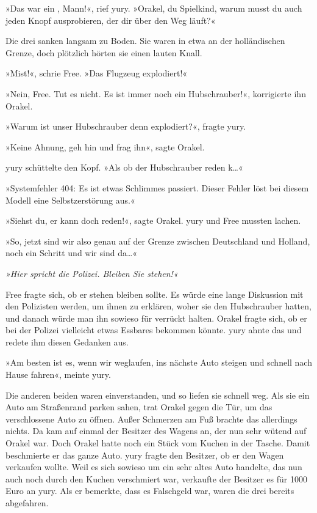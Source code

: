 »Das war ein , Mann!«, rief yury. »Orakel, du Spielkind, warum musst du auch jeden Knopf ausprobieren, der dir über den Weg läuft?«

Die drei sanken langsam zu Boden. Sie waren in etwa an der holländischen Grenze, doch plötzlich hörten sie einen lauten Knall.

»Mist!«, schrie Free. »Das Flugzeug explodiert!«

»Nein, Free. Tut es nicht. Es ist immer noch ein Hubschrauber!«, korrigierte ihn Orakel.

»Warum ist unser Hubschrauber denn explodiert?«, fragte yury.

»Keine Ahnung, geh hin und frag ihn«, sagte Orakel.

yury schüttelte den Kopf. »Als ob der Hubschrauber reden k…«

»Systemfehler 404: Es ist etwas Schlimmes passiert. Dieser Fehler löst bei diesem Modell eine Selbstzerstörung aus.«

»Siehst du, er kann doch reden!«, sagte Orakel. yury und Free mussten lachen.

»So, jetzt sind wir also genau auf der Grenze zwischen Deutschland und Holland, noch ein Schritt und wir sind da…«

\textit{»Hier spricht die Polizei. Bleiben Sie stehen!«}

Free fragte sich, ob er stehen bleiben sollte. Es würde eine lange Diskussion mit den Polizisten werden, um ihnen zu erklären, woher sie den Hubschrauber hatten, und danach würde man ihn sowieso für verrückt halten. Orakel fragte sich, ob er bei der Polizei vielleicht etwas Essbares bekommen könnte. yury ahnte das und redete ihm diesen Gedanken aus.

»Am besten ist es, wenn wir weglaufen, ins nächste Auto steigen und schnell nach Hause fahren«, meinte yury.

Die anderen beiden waren einverstanden, und so liefen sie schnell weg. Als sie ein Auto am Straßenrand parken sahen, trat Orakel gegen die Tür, um das verschlossene Auto zu öffnen. Außer Schmerzen am Fuß brachte das allerdings nichts. Da kam auf einmal der Besitzer des Wagens an, der nun sehr wütend auf Orakel war. Doch Orakel hatte noch ein Stück vom Kuchen in der Tasche. Damit beschmierte er das ganze Auto. yury fragte den Besitzer, ob er den Wagen verkaufen wollte. Weil es sich sowieso um ein sehr altes Auto handelte, das nun auch noch durch den Kuchen verschmiert war, verkaufte der Besitzer es für 1000 Euro an yury. Als er bemerkte, dass es Falschgeld war, waren die drei bereits abgefahren.


